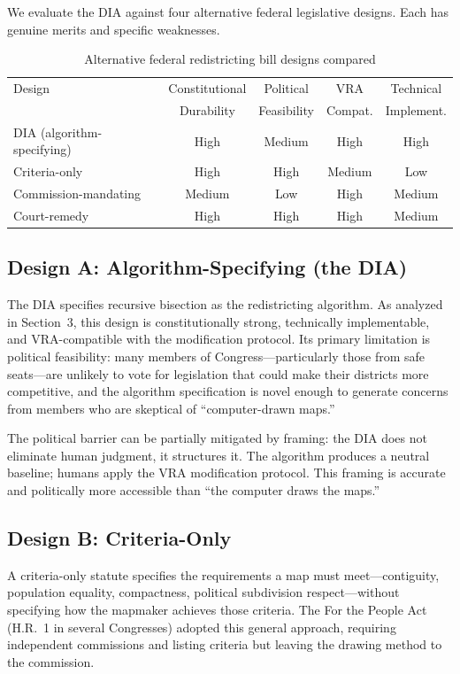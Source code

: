 We evaluate the DIA against four alternative federal legislative designs. Each has genuine merits and specific weaknesses.

\begin{table}[h]
\centering
\caption{Alternative federal redistricting bill designs compared}
\label{tab:designs}
\begin{tabular}{@{}lcccc@{}}
\toprule
Design & Constitutional & Political & VRA & Technical \\
       & Durability     & Feasibility & Compat. & Implement. \\
\midrule
DIA (algorithm-specifying) & High & Medium & High & High \\
Criteria-only              & High & High   & Medium & Low \\
Commission-mandating       & Medium & Low   & High & Medium \\
Court-remedy               & High & High   & High & Medium \\
\bottomrule
\end{tabular}
\end{table}

\subsection{Design A: Algorithm-Specifying (the DIA)}

The DIA specifies recursive bisection as the redistricting algorithm. As analyzed in Section~3, this design is constitutionally strong, technically implementable, and VRA-compatible with the modification protocol. Its primary limitation is political feasibility: many members of Congress---particularly those from safe seats---are unlikely to vote for legislation that could make their districts more competitive, and the algorithm specification is novel enough to generate concerns from members who are skeptical of ``computer-drawn maps.''

The political barrier can be partially mitigated by framing: the DIA does not eliminate human judgment, it structures it. The algorithm produces a neutral baseline; humans apply the VRA modification protocol. This framing is accurate and politically more accessible than ``the computer draws the maps.''

\subsection{Design B: Criteria-Only}

A criteria-only statute specifies the requirements a map must meet---contiguity, population equality, compactness, political subdivision respect---without specifying how the mapmaker achieves those criteria. The For the People Act (H.R.\ 1 in several Congresses) adopted this general approach, requiring independent commissions and listing criteria but leaving the drawing method to the commission.


